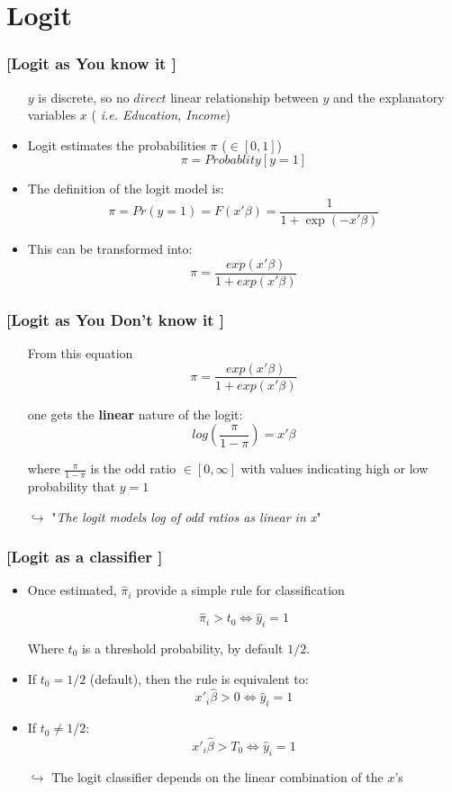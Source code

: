 \documentclass[xcolor=x11names,compress, handhouts]{beamer}
\renewcommand{\(}{\begin{columns}}
\renewcommand{\)}{\end{columns}}
\newcommand{\<}[1]{\begin{column}{#1}}
\renewcommand{\>}{\end{column}}
\begin{document}
\section{Logit}

\begin{frame} %
\frametitle{\textcolor{brique}{[Logit as You know it ]}}
\pause
 \begin{itemize}[<+->]
  \item[] $y$  is discrete, so no $direct$ linear relationship between $y$ and the explanatory variables $x$ ( \textit{i.e. Education, Income})
  \item Logit estimates the probabilities $\pi$ ($\in [0,1]$)  $$\pi = Probablity[y= 1]$$
  \item The definition of the logit model is:
  $$
  \pi = Pr \left( y = 1\right) = F( x'\beta) = \frac{1}{1+\exp(-x'\beta)}
  $$
  \item This can be transformed into:
  $$
  \pi = \frac{exp(x'\beta)}{1+ exp(x'\beta)}
  $$
\end{itemize}
\end{frame}


\begin{frame} %
\frametitle{\textcolor{brique}{[Logit as You \textbf{Don't} know it ]}}
\pause
 \begin{itemize}[<+->]
  \item[] From this equation
  $$
  \pi = \frac{exp(x'\beta)}{1+ exp(x'\beta)}
  $$
  \item[] one gets  the \textbf{linear} nature of the logit:
   $$
  log(\frac{\pi}{1 - \pi}) = x'\beta
  $$
  \item[]where $\frac{\pi}{1 - \pi}$ is the odd ratio $\in [0,\infty]$  with values indicating high or low probability that $y=1$
  \item[$\hookrightarrow$] "\emph{The logit models log of odd ratios as linear in x}"
\end{itemize}
\end{frame}



\begin{frame} %
\frametitle{\textcolor{brique}{[Logit as a classifier ]}}
\pause
 \begin{itemize}[<+->]
  \item Once estimated, $\widehat \pi_i$ provide a simple rule for classification
  \item[] $$
   \widehat \pi_i > t_0  \Leftrightarrow \widehat y_i = 1
  $$
    \item[] Where $t_0$ is a threshold probability, by default $1/2$.
  \item If  $t_0 = 1/2$ (default), then the rule is equivalent to:
   $$
   x'_i \widehat \beta > 0  \Leftrightarrow \widehat y_i = 1
  $$
  \item If  $t_0 \neq 1/2$:
   $$
   x'_i \widehat \beta > T_0  \Leftrightarrow \widehat y_i = 1
  $$
  \item[$\hookrightarrow$] The logit classifier depends on the linear combination of the $x$'s
\end{itemize}
\end{frame}
\end{document}
